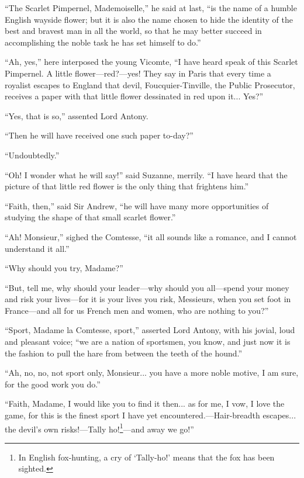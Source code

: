 \enquote{The Scarlet Pimpernel, Mademoiselle,} he said at last, \enquote{is the name of a humble English wayside flower; but it is also the name chosen to hide the identity of the best and bravest man in all the world, so that he may better succeed in accomplishing the noble task he has set himself to do.}

\enquote{Ah, yes,} here interposed the young Vicomte, \enquote{I have heard speak of this Scarlet Pimpernel. A little flower---red?---yes! They say in Paris that every time a royalist escapes to England that devil, Foucquier-Tinville, the Public Prosecutor, receives a paper with that little flower dessinated in red upon it... Yes?}

\enquote{Yes, that is so,} assented Lord Antony.

\enquote{Then he will have received one such paper to-day?}

\enquote{Undoubtedly.}

\enquote{Oh! I wonder what he will say!} said Suzanne, merrily. \enquote{I have heard that the picture of that little red flower is the only thing that frightens him.}

\enquote{Faith, then,} said Sir Andrew, \enquote{he will have many more opportunities of studying the shape of that small scarlet flower.}

\enquote{Ah! Monsieur,} sighed the Comtesse, \enquote{it all sounds like a romance, and I cannot understand it all.}

\enquote{Why should you try, Madame?}

\enquote{But, tell me, why should your leader---why should you all---spend your money and risk your lives---for it is your lives you risk, Messieurs, when you set foot in France---and all for us French men and women, who are nothing to you?}

\enquote{Sport, Madame la Comtesse, sport,} asserted Lord Antony, with his jovial, loud and pleasant voice; \enquote{we are a nation of sportsmen, you know, and just now it is the fashion to pull the hare from between the teeth of the hound.}

\enquote{Ah, no, no, not sport only, Monsieur... you have a more noble motive, I am sure, for the good work you do.}

\enquote{Faith, Madame, I would like you to find it then... as for me, I vow, I love the game, for this is the finest sport I have yet encountered.---Hair-breadth escapes... the devil's own risks!---Tally ho!\footnote{In English fox-hunting, a cry of \enquote{Tally-ho!} means that the fox has been sighted.}---and away we go!}

